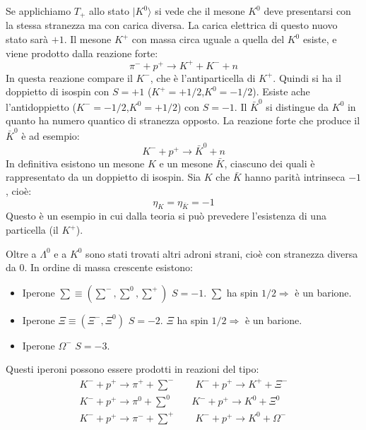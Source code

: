 Se applichiamo $T_+$ allo stato $|K^0\rangle$ si vede che il mesone $K^0$ deve 
presentarsi con la stessa
stranezza ma con carica diversa.
La carica elettrica di questo nuovo stato sarà $+1$. Il mesone $K^+$ con massa 
circa uguale a quella del $K^0$
esiste, e viene prodotto dalla reazione forte:
\[
\pi^-+p^+\rightarrow K^++K^-+n
\]
In questa reazione compare il $K^-$, che è l'antiparticella di $K^+$.
Quindi si ha il doppietto di isospin con $S=+1$ ($K^+=+1/2$,$K^0=-1/2$).
Esiste ache l'antidoppietto ($K^-=-1/2$,$K^0=+1/2$) con $S=-1$. Il $\bar{K}^0$ 
si distingue da $K^0$ in quanto ha
numero quantico di stranezza opposto. La reazione forte che produce il 
$\bar{K}^0$ è ad esempio:
\begin{equation}
K^-+p^+\rightarrow \bar{K}^0+n
\end{equation}
In definitiva esistono un mesone $K$ e un mesone $\bar{K}$, ciascuno dei quali 
è rappresentato da un doppietto di isospin.
Sia $K$ che $\bar{K}$ hanno parità intrinseca $-1$, cioè:
\begin{equation}
\eta_{K}=\eta_{\bar{K}}=-1
\end{equation}
Questo è un esempio in cui dalla teoria si può prevedere l'esistenza di una 
particella (il $K^+$).

Oltre a $\Lambda^0$ e a $K^0$ sono stati trovati altri adroni strani, cioè con 
stranezza diversa da $0$. In ordine
di massa crescente esistono:
\begin{itemize}
\item Iperone $\sum\equiv (\sum^-,\sum^0,\sum^+)$ $S=-1$. $\sum$ ha spin 
$1/2\Rightarrow$ è un barione.
\item Iperone $\Xi\equiv (\Xi^-,\Xi^0)$ $S=-2$. $\Xi$ ha spin $1/2\Rightarrow$ 
è un barione.
\item Iperone $\Omega^-$ $S=-3$.
\end{itemize}

Questi iperoni possono essere prodotti in reazioni del tipo:
\begin{gather}
K^-+p^+\rightarrow \pi^++\sum^-\qquad K^-+p^+\rightarrow K^++\Xi^-\\
K^-+p^+\rightarrow \pi^0+\sum^0\qquad K^-+p^+\rightarrow K^0+\Xi^0\\
K^-+p^+\rightarrow \pi^-+\sum^+\qquad K^-+p^+\rightarrow K^0+\Omega^-
\end{gather}

